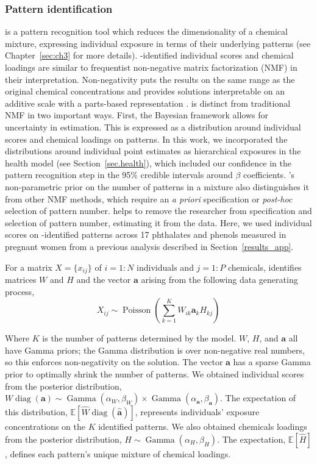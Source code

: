 \subsubsection{Pattern identification}
\label{sec.patterns}
\bnmf is a pattern recognition tool which reduces the dimensionality of a chemical mixture, expressing individual exposure in terms of their underlying patterns (see Chapter~\ref{sec:ch3} for more details). \bnmfc-identified individual scores and chemical loadings are similar to frequentist non-negative matrix factorization (NMF) in their interpretation. Non-negativity puts the results on the same range as the original chemical concentrations and provides solutions interpretable on an additive scale with a parts-based representation \citep{holtzman2018machine, lee1999learning}. \bnmf is distinct from traditional NMF in two important ways. First, the Bayesian framework allows for uncertainty in estimation. This is expressed as a distribution around individual scores and chemical loadings on patterns. In this work, we incorporated the distributions around individual point estimates as hierarchical exposures in the health model (see Section~\ref{sec.health}), which included our confidence in the pattern recognition step in the 95\% credible intervals around $\beta$ coefficients. \bnmfc's non-parametric prior on the number of patterns in a mixture also distinguishes it from other NMF methods, which require an \textit{a priori} specification or \textit{post-hoc} selection of pattern number. \bnmf helps to remove the researcher from specification and selection of pattern number, estimating it from the data. Here, we used individual scores on \bnmfc-identified patterns across 17 phthalates and phenols measured in pregnant women from a previous analysis described in Section~\ref{results_app}.

For a matrix $X =\lbrace x_{i j}\rbrace $ of $i = 1:N$ individuals and $j = 1:P$ chemicals, \bnmf identifies matrices $W$ and $H$ and the vector $\mathbf{a}$ arising from the following data generating process,
\begin{equation}
\label{nmf}
X_{i j} \sim \operatorname{Poisson}\left(\sum^K_{k=1} W_{i k} \mathbf{a}_k H_{k j}\right)
\end{equation}

Where $K$ is the number of patterns determined by the model. $W$, $H$, and $\mathbf{a}$ all have Gamma priors; the Gamma distribution is over non-negative real numbers, so this enforces non-negativity on the solution. The vector $\mathbf{a}$ has a sparse Gamma prior to optimally shrink the number of patterns. We obtained individual scores from the posterior distribution, ${W\operatorname{diag}(\mathbf{a}) \sim \operatorname{Gamma}(\alpha_W, \beta_W)} \times
\operatorname{Gamma}(\alpha_\mathbf{a}, \beta_\mathbf{a})$. The expectation of this distribution, $\mathbb{E}[\widehat{W}\operatorname{diag}(\widehat{\mathbf{a}})]$, represents individuals' exposure concentrations on the $K$ identified patterns. We also obtained chemicals loadings from the posterior distribution, $H \sim \operatorname{Gamma}(\alpha_H, \beta_H)$. The expectation, $\mathbb{E}[\widehat{H}]$, defines each pattern's unique mixture of chemical loadings.

